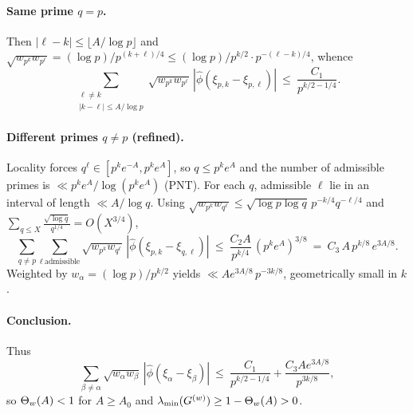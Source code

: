 \paragraph{Same prime $q=p$.}
Then $|\ell-k|\le \lfloor A/\log p\rfloor$ and
$\sqrt{w_{p^k}w_{p^\ell}}=(\log p)/p^{(k+\ell)/4}\le (\log p)/p^{k/2}\cdot p^{-(\ell-k)/4}$,
whence
\[
\sum_{\substack{\ell\ne k\\|k-\ell|\le A/\log p}}\sqrt{w_{p^k}w_{p^\ell}}\,|\hat\phi(\xi_{p,k}-\xi_{p,\ell})|
\ \le\ \frac{C_1}{p^{k/2-1/4}}.
\]

\paragraph{Different primes $q\ne p$ (refined).}
Locality forces $q^\ell\in[p^k e^{-A}, p^k e^A]$, so $q\le p^k e^A$ and the number of admissible primes is $\ll p^k e^A/\log(p^k e^A)$ (PNT).
For each $q$, admissible $\ell$ lie in an interval of length $\ll A/\log q$.
Using $\sqrt{w_{p^k}w_{q^\ell}}\le \sqrt{\log p\log q}\,p^{-k/4}q^{-\ell/4}$ and $\sum_{q\le X}\frac{\sqrt{\log q}}{q^{1/4}}=O(X^{3/4})$,
\[
\sum_{q\ne p}\sum_{\ell\ \text{admissible}} \sqrt{w_{p^k}w_{q^\ell}}\,|\hat\phi(\xi_{p,k}-\xi_{q,\ell})|
\ \le\ \frac{C_2 A}{p^{k/4}}\,(p^k e^A)^{3/8}
\ =\ C_3\,A\,p^{k/8}\,e^{3A/8}.
\]
Weighted by $w_\alpha=(\log p)/p^{k/2}$ yields $\ll A e^{3A/8}\,p^{-3k/8}$, geometrically small in $k$.

\paragraph{Conclusion.}
Thus
\[
\sum_{\beta\ne\alpha}\sqrt{w_\alpha w_\beta}\,|\hat\phi(\xi_\alpha-\xi_\beta)|
\ \le\ \frac{C_1}{p^{k/2-1/4}}+\frac{C_3 A e^{3A/8}}{p^{3k/8}},
\]
so $\Theta_w(A)<1$ for $A\ge A_0$ and $\lambda_{\min}(G^{(w)})\ge 1-\Theta_w(A)>0$.
\qedhere
